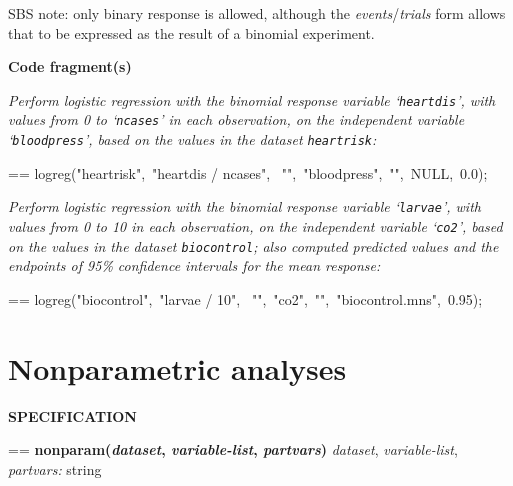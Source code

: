 \documentclass{book}
\makeatletter
\newcommand\Texinfocommandstyletextvar[1]{{\normalfont{}\textsl{#1}}}%
\newenvironment{Texinfopreformatted}{%
  \par\GNUTobeylines\obeyspaces\frenchspacing\parskip=\z@\parindent=\z@}{}
{\catcode`\^^M=13 \gdef\GNUTobeylines{\catcode`\^^M=13 \def^^M{\null\par}}}
\newenvironment{Texinfoindented}{\begin{list}{}{}\item\relax}{\end{list}}
\renewcommand{\_}{\Texinfounderscore\discretionary{}{}{}}
\makeatother
\begin{document}
SBS note: only binary response is allowed, although the
\Texinfocommandstyletextvar{events}/\Texinfocommandstyletextvar{trials} form
allows that to be expressed as the result of a binomial experiment.

\noindent{}\textbf{Code fragment(s)}

\emph{Perform logistic regression with the binomial response variable
`\texttt{heartdis}', with values from 0 to `\texttt{ncases}' in each observation,
on the independent variable `\texttt{bloodpress}', based on the values in
the dataset \texttt{heartrisk}:}
\begin{Texinfoindented}
\begin{Texinfopreformatted}%
\ttfamily logreg("heartrisk",\ "heartdis / ncases",
\                 "",\ "bloodpress",\ "",\ NULL,\ 0.0);
\end{Texinfopreformatted}
\end{Texinfoindented}

\emph{Perform logistic regression with the binomial response variable
`\texttt{larvae}', with values from 0 to 10 in each observation,
on the independent variable `\texttt{co2}', based on the values in
the dataset \texttt{biocontrol}; also computed predicted values and
the endpoints of 95\% confidence intervals for the mean response:}
\begin{Texinfoindented}
\begin{Texinfopreformatted}%
\ttfamily logreg("biocontrol",\ "larvae / 10",
\                 "",\ "co2",\ "",\ "biocontrol.mns",\ 0.95);
\end{Texinfopreformatted}
\end{Texinfoindented}

\section{{Nonparametric analyses}}
\label{anchor:Nonparametric-analyses}%

\noindent{}\textbf{SPECIFICATION}
\begin{Texinfoindented}
\begin{Texinfopreformatted}%
\textbf{nonparam(\Texinfocommandstyletextvar{dataset}, \Texinfocommandstyletextvar{variable-list}, \Texinfocommandstyletextvar{partvars})}
\Texinfocommandstyletextvar{dataset}, \Texinfocommandstyletextvar{variable-list}, \Texinfocommandstyletextvar{partvars:} string
\end{Texinfopreformatted}
\end{Texinfoindented}
\end{document}
